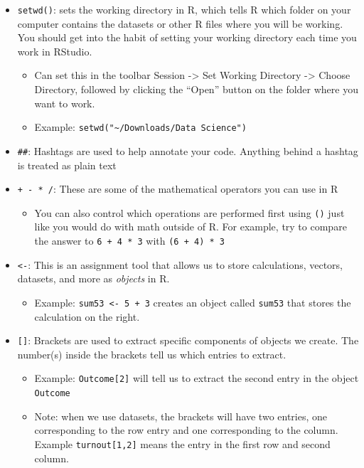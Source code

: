 \documentclass[
  letterpaper,
  DIV=11,
  numbers=noendperiod]{scrreprt}
\providecommand{\tightlist}{%
  \setlength{\itemsep}{0pt}\setlength{\parskip}{0pt}}\usepackage{longtable,booktabs,array}
\begin{document}
\begin{itemize}
\tightlist
\item
  \texttt{setwd()}: sets the working directory in R, which tells R which
  folder on your computer contains the datasets or other R files where
  you will be working. You should get into the habit of setting your
  working directory each time you work in RStudio.

  \begin{itemize}
  \tightlist
  \item
    Can set this in the toolbar Session -\textgreater{} Set Working
    Directory -\textgreater{} Choose Directory, followed by clicking the
    ``Open'' button on the folder where you want to work.
  \item
    Example: \texttt{setwd("\textasciitilde{}/Downloads/Data\ Science")}
  \end{itemize}
\item
  \texttt{\#\#}: Hashtags are used to help annotate your code. Anything
  behind a hashtag is treated as plain text
\item
  \texttt{+\ -\ *\ /}: These are some of the mathematical operators you
  can use in R

  \begin{itemize}
  \tightlist
  \item
    You can also control which operations are performed first using
    \texttt{()} just like you would do with math outside of R. For
    example, try to compare the answer to \texttt{6\ +\ 4\ *\ 3} with
    \texttt{(6\ +\ 4)\ *\ 3}
  \end{itemize}
\item
  \texttt{\textless{}-}: This is an assignment tool that allows us to
  store calculations, vectors, datasets, and more as \emph{objects} in
  R.

  \begin{itemize}
  \tightlist
  \item
    Example: \texttt{sum53\ \textless{}-\ 5\ +\ 3} creates an object
    called \texttt{sum53} that stores the calculation on the right.
  \end{itemize}
\item
  \texttt{{[}{]}}: Brackets are used to extract specific components of
  objects we create. The number(s) inside the brackets tell us which
  entries to extract.

  \begin{itemize}
  \tightlist
  \item
    Example: \texttt{Outcome{[}2{]}} will tell us to extract the second
    entry in the object \texttt{Outcome}
  \item
    Note: when we use datasets, the brackets will have two entries, one
    corresponding to the row entry and one corresponding to the column.
    Example \texttt{turnout{[}1,2{]}} means the entry in the first row
    and second column.
  \end{itemize}
\end{itemize}
\end{document}
